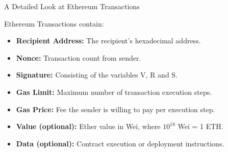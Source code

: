\documentclass[handout]{beamer}
\begin{document}
\begin{frame}{A Detailed Look at Ethereum Transactions}

Ethereum Transactions contain:
	\begin{itemize}
		\item<1-> \textbf{Recipient Address:} The recipient's hexadecimal 		address.
		\item<2-> \textbf{Nonce:} Transaction count from sender.
		\item<3-> \textbf{Signature:} Consisting of the variables V, R and S.
		\item<4-> \textbf{Gas Limit:} Maximum number of transaction execution steps.
		\item<5-> \textbf{Gas Price:} Fee the sender is willing to pay per execution step. 
		\item<6-> \textbf{Value (optional):} Ether value in Wei, where $10^{18}$ Wei = 1 ETH. 
		\item<7-> \textbf{Data (optional):} Contract execution or deployment instructions.
	\end{itemize}

\end{frame}
\end{document}
